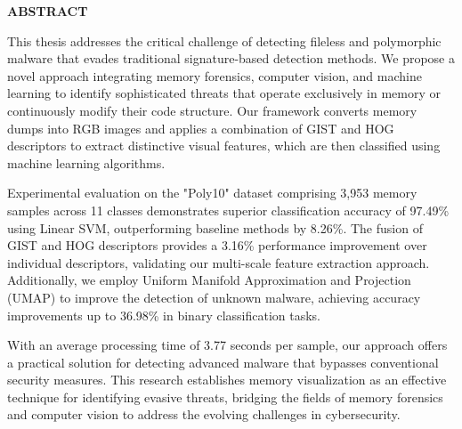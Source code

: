 \begin{center}
	\Huge\uppercase{\textbf{Abstract}}
\end{center}

{
\setlength{\baselineskip}{25pt}

This thesis addresses the critical challenge of detecting fileless and polymorphic malware that evades traditional signature-based detection methods. We propose a novel approach integrating memory forensics, computer vision, and machine learning to identify sophisticated threats that operate exclusively in memory or continuously modify their code structure. Our framework converts memory dumps into RGB images and applies a combination of GIST and HOG descriptors to extract distinctive visual features, which are then classified using machine learning algorithms.

Experimental evaluation on the "Poly10" dataset comprising 3,953 memory samples across 11 classes demonstrates superior classification accuracy of 97.49\% using Linear SVM, outperforming baseline methods by 8.26\%. The fusion of GIST and HOG descriptors provides a 3.16\% performance improvement over individual descriptors, validating our multi-scale feature extraction approach. Additionally, we employ Uniform Manifold Approximation and Projection (UMAP) to improve the detection of unknown malware, achieving accuracy improvements up to 36.98\% in binary classification tasks.

With an average processing time of 3.77 seconds per sample, our approach offers a practical solution for detecting advanced malware that bypasses conventional security measures. This research establishes memory visualization as an effective technique for identifying evasive threats, bridging the fields of memory forensics and computer vision to address the evolving challenges in cybersecurity.
}
\clearpage
